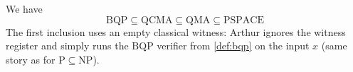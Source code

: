 We have \cite{gharibianQuantumComplexityTheory}
\[
\mathrm{BQP}
\subseteq
\mathrm{QCMA}
\subseteq
\mathrm{QMA}
\subseteq
\mathrm{PSPACE}
\]
The first inclusion
uses an empty classical witness:
Arthur ignores the witness register and simply runs the
\(
\mathrm{BQP}
\)
verifier from \autoref{def:bqp} on the input $x$ (same story as for \(
\mathrm{P}\subseteq\mathrm{NP}
\)).


